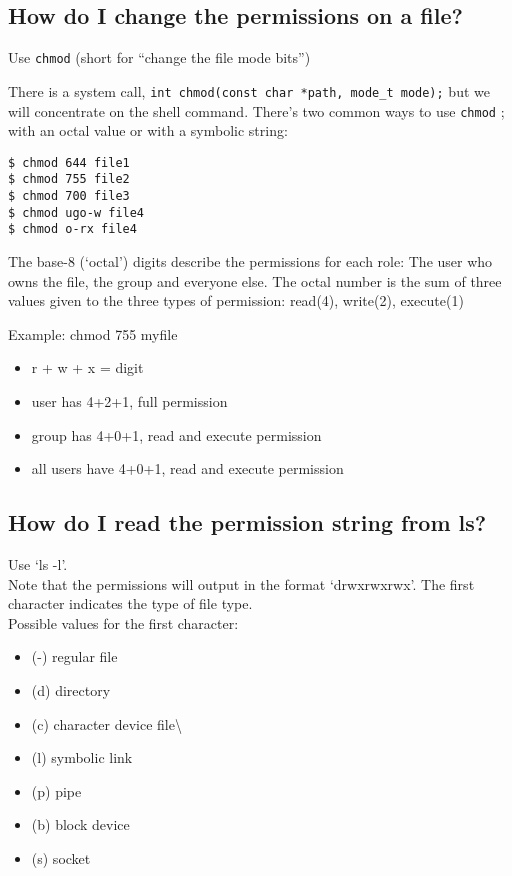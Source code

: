 \subsection{How do I change the permissions on a
file?}\label{how-do-i-change-the-permissions-on-a-file}

Use \texttt{chmod} (short for ``change the file mode bits'')

There is a system call,
\texttt{int\ chmod(const\ char\ *path,\ mode\_t\ mode);} but we will
concentrate on the shell command. There's two common ways to use
\texttt{chmod} ; with an octal value or with a symbolic string:

\begin{verbatim}
$ chmod 644 file1
$ chmod 755 file2
$ chmod 700 file3
$ chmod ugo-w file4
$ chmod o-rx file4
\end{verbatim}

The base-8 (`octal') digits describe the permissions for each role: The
user who owns the file, the group and everyone else. The octal number is
the sum of three values given to the three types of permission: read(4),
write(2), execute(1)

Example: chmod 755 myfile

\begin{itemize}
\itemsep1pt\parskip0pt
\item
  r + w + x = digit
\item
  user has 4+2+1, full permission
\item
  group has 4+0+1, read and execute permission
\item
  all users have 4+0+1, read and execute permission
\end{itemize}

\subsection{How do I read the permission string from
ls?}\label{how-do-i-read-the-permission-string-from-ls}

Use `ls -l'.\\Note that the permissions will output in the format
`drwxrwxrwx'. The first character indicates the type of file
type.\\Possible values for the first character:

\begin{itemize}
\itemsep1pt\parskip0pt
\item
  (-) regular file
\item
  (d) directory
\item
  (c) character device file\textbackslash{}
\item
  (l) symbolic link
\item
  (p) pipe
\item
  (b) block device
\item
  (s) socket
\end{itemize}

